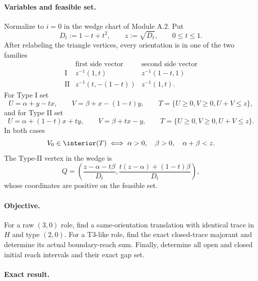 \paragraph{Variables and feasible set.}
Normalize to $i=0$ in the wedge chart of Module A.2.  Put
\[
 D_t:=1-t+t^2,
 \qquad
 z:=\sqrt{D_t},
 \qquad
 0\le t\le1.
\]
After relabeling the triangle vertices, every orientation is in one of the
two families
\[
 \begin{array}{c|cc}
 &\text{first side vector}&\text{second side vector}\\ \hline
 \mathrm I&z^{-1}(1,t)&z^{-1}(1-t,1)\\
 \mathrm {II}&z^{-1}(t,-(1-t))&z^{-1}(1,t).
 \end{array}
\]
For Type I set
\begin{equation}
 U=\alpha+y-tx,
 \qquad
 V=\beta+x-(1-t)y,
 \qquad
 T=\{U\ge0,V\ge0,U+V\le z\},
 \label{eq:app-orientation-I}
\end{equation}
and for Type II set
\begin{equation}
 U=\alpha+(1-t)x+ty,
 \qquad
 V=\beta+tx-y,
 \qquad
 T=\{U\ge0,V\ge0,U+V\le z\}.
 \label{eq:app-orientation-II}
\end{equation}
In both cases
\begin{equation}
 V_0\in\interior(T)
 \iff
 \alpha>0,
 \quad
 \beta>0,
 \quad
 \alpha+\beta<z.
 \label{eq:app-orientation-interior}
\end{equation}
The Type-II vertex in the wedge is
\begin{equation}
 Q=\left(
 \frac{z-\alpha-t\beta}{D_t},
 \frac{t(z-\alpha)+(1-t)\beta}{D_t}
 \right),
 \label{eq:app-orientation-II-Q}
\end{equation}
whose coordinates are positive on the feasible set.

\paragraph{Objective.}
For a raw $(3,0)$ role, find a same-orientation translation with identical
trace in $H$ and type $(2,0)$.  For a T3-like role, find the exact
closed-trace majorant and determine its actual boundary-reach sum.  Finally,
determine all open and closed initial reach intervals and their exact gap set.

\paragraph{Exact result.}

